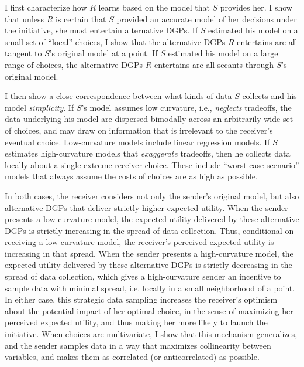 \documentclass[11pt,dvipsnames]{article}
\begin{document}
I first characterize how $R$ learns based on the model that $S$ provides her.
I show that unless $R$ is certain that $S$ provided an accurate model of her decisions under the initiative, she must entertain alternative DGPs.
If $S$ estimated his model on a small set of ``local'' choices, I show that the alternative DGPs $R$ entertains are all tangent to $S$'s original model at a point.
If $S$ estimated his model on a large range of choices, the alternative DGPs $R$ entertains are all secants through $S$'s original model.

I then show a close correspondence between what kinds of data $S$ collects and his model \emph{simplicity}.
If $S$'s model assumes low curvature, i.e., \emph{neglects} tradeoffs, the data underlying his model are dispersed bimodally across an arbitrarily wide set of choices, and may draw on information that is irrelevant to the receiver's eventual choice.
Low-curvature models include linear regression models.
If $S$ estimates high-curvature models that \emph{exaggerate} tradeoffs, then he collects data locally about a single extreme receiver choice.
These include ``worst-case scenario'' models that always assume the costs of choices are as high as possible.

In both cases, the receiver considers not only the sender's original model, but also alternative DGPs that deliver strictly higher expected utility.
When the sender presents a low-curvature model, the expected utility delivered by these alternative DGPs is strictly increasing in the spread of data collection.
Thus, conditional on receiving a low-curvature model, the receiver's perceived expected utility is increasing in that spread.
When the sender presents a high-curvature model, the expected utility delivered by these alternative DGPs is strictly decreasing in the spread of data collection, which gives a high-curvature sender an incentive to sample data with minimal spread, i.e. locally in a small neighborhood of a point.
In either case, this strategic data sampling increases the receiver's optimism about the potential impact of her optimal choice, in the sense of maximizing her perceived expected utility, and thus making her more likely to launch the initiative.
When choices are multivariate, I show that this mechanism generalizes, and the sender samples data in a way that maximizes collinearity between variables, and makes them as correlated (or anticorrelated) as possible.
\end{document}
